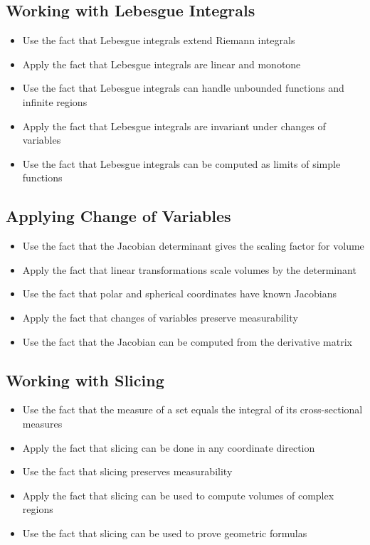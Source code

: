 \subsection*{Working with Lebesgue Integrals}
\begin{itemize}
\item Use the fact that Lebesgue integrals extend Riemann integrals
\item Apply the fact that Lebesgue integrals are linear and monotone
\item Use the fact that Lebesgue integrals can handle unbounded functions and infinite regions
\item Apply the fact that Lebesgue integrals are invariant under changes of variables
\item Use the fact that Lebesgue integrals can be computed as limits of simple functions
\end{itemize}

\subsection*{Applying Change of Variables}
\begin{itemize}
\item Use the fact that the Jacobian determinant gives the scaling factor for volume
\item Apply the fact that linear transformations scale volumes by the determinant
\item Use the fact that polar and spherical coordinates have known Jacobians
\item Apply the fact that changes of variables preserve measurability
\item Use the fact that the Jacobian can be computed from the derivative matrix
\end{itemize}

\subsection*{Working with Slicing}
\begin{itemize}
\item Use the fact that the measure of a set equals the integral of its cross-sectional measures
\item Apply the fact that slicing can be done in any coordinate direction
\item Use the fact that slicing preserves measurability
\item Apply the fact that slicing can be used to compute volumes of complex regions
\item Use the fact that slicing can be used to prove geometric formulas
\end{itemize}

